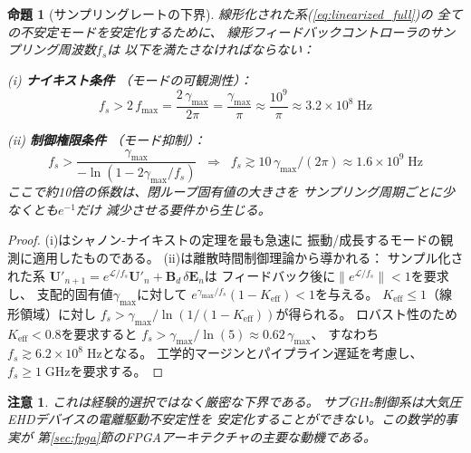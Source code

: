 \documentclass[12pt,twocolumn]{ltjsarticle}
\newtheorem{proposition}[theorem]{命題}
\newtheorem{remark}{注意}
\newcommand{\ee}{\mathbf{E}}
\newcommand{\uu}{\mathbf{U}}
\newcommand{\Lop}{\mathcal{L}}
\begin{document}
\begin{proposition}[サンプリングレートの下界]
\label{prop:sampling}
線形化された系\textnormal{(\ref{eq:linearized_full})}の
全ての不安定モードを安定化するために、
線形フィードバックコントローラのサンプリング周波数$f_s$は
以下を満たさなければならない：

\noindent\textnormal{(i)} \textbf{ナイキスト条件}
（モードの可観測性）：
\begin{equation}
  f_s > 2\,f_{\max}
  = \frac{2\,\gamma_{\max}}{2\pi}
  = \frac{\gamma_{\max}}{\pi}
  \approx \frac{10^9}{\pi}
  \approx 3.2 \times 10^8\;\mathrm{Hz}
  \label{eq:nyquist}
\end{equation}

\noindent\textnormal{(ii)} \textbf{制御権限条件}
（モード抑制）：
\begin{equation}
  f_s > \frac{\gamma_{\max}}{-\ln(1 - 2\gamma_{\max}/f_s)}
  \;\;\Rightarrow\;\;
  f_s \gtrsim 10\,\gamma_{\max}/(2\pi)
  \approx 1.6 \times 10^9\;\mathrm{Hz}
  \label{eq:control_authority}
\end{equation}
ここで約10倍の係数は、閉ループ固有値の大きさを
サンプリング周期ごとに少なくとも$e^{-1}$だけ
減少させる要件から生じる。
\end{proposition}

\begin{proof}
(i)はシャノン-ナイキストの定理を最も急速に
振動/成長するモードの観測に適用したものである。
(ii)は離散時間制御理論から導かれる：
サンプル化された系
$\uu'_{n+1} = e^{\Lop/f_s}\uu'_n + \mathbf{B}_d\,\delta\ee_n$は
フィードバック後に$\|e^{\Lop/f_s}\| < 1$を要求し、
支配的固有値$\gamma_{\max}$に対して
$e^{\gamma_{\max}/f_s}(1 - K_{\mathrm{eff}}) < 1$を与える。
$K_{\mathrm{eff}} \leq 1$（線形領域）に対し
$f_s > \gamma_{\max} / \ln(1/(1-K_{\mathrm{eff}}))$が得られる。
ロバスト性のため$K_{\mathrm{eff}} < 0.8$を要求すると
$f_s > \gamma_{\max}/\ln(5) \approx 0.62\,\gamma_{\max}$、
すなわち$f_s \gtrsim 6.2 \times 10^8\;\mathrm{Hz}$となる。
工学的マージンとパイプライン遅延を考慮し、
$f_s \geq 1\;\mathrm{GHz}$を要求する。
\end{proof}

\begin{remark}
これは経験的選択ではなく厳密な下界である。
サブGHz制御系は大気圧EHDデバイスの電離駆動不安定性を
安定化することができない。この数学的事実が
第\ref{sec:fpga}節のFPGAアーキテクチャの主要な動機である。
\end{remark}

\end{document}
